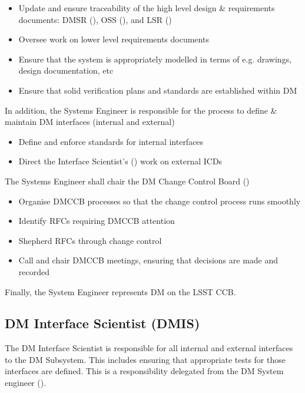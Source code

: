 \begin{itemize}
\item Update and ensure traceability of the high level design \& requirements documents: DMSR (), OSS (), and LSR ()
\item Oversee work on lower level requirements documents
\item Ensure  that the system is appropriately modelled in terms of e.g. drawings, design documentation, etc
\item Ensure  that solid verification plans and standards are established within DM
\end{itemize}

In addition, the Systems Engineer is responsible for the process to define \& maintain DM interfaces (internal and external)

\begin{itemize}
\item Define and enforce standards for internal interfaces
\item Direct the Interface Scientist's () work on external ICDs
\end{itemize}

The Systems Engineer shall chair the DM Change Control Board ()

\begin{itemize}
\item Organise DMCCB processes so that the change control process runs smoothly
\item Identify RFCs requiring DMCCB attention
\item Shepherd RFCs through change control
\item Call and chair DMCCB meetings, ensuring that decisions are made and recorded
\end{itemize}

Finally, the System Engineer represents DM on the LSST CCB.

\subsection{DM Interface Scientist (DMIS) \label{role:dmis}}

The DM Interface Scientist is responsible for all internal and external interfaces to the DM Subsystem. This includes ensuring that appropriate tests for those interfaces are defined. This is a responsibility delegated from the DM System engineer ().

